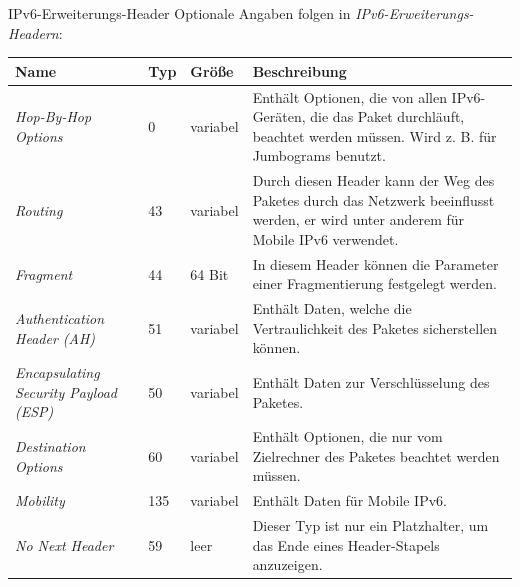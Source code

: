 \begin{bonus}{IPv6-Erweiterungs-Header}
    Optionale Angaben folgen in \emph{IPv6-Erweiterungs-Headern}:

    \begin{tabularx}{\textwidth}{|X|l|l|X|}
        \hline
        Name                                        & Typ & Größe    & Beschreibung                                                                                                                         \\
        \hline
        \hline
        \emph{Hop-By-Hop Options}                   & 0   & variabel & Enthält Optionen, die von allen IPv6-Geräten, die das Paket durchläuft, beachtet werden müssen. Wird z. B. für Jumbograms benutzt.   \\
        \hline
        \emph{Routing}                              & 43  & variabel & Durch diesen Header kann der Weg des Paketes durch das Netzwerk beeinflusst werden, er wird unter anderem für Mobile IPv6 verwendet. \\
        \hline
        \emph{Fragment}                             & 44  & 64 Bit   & In diesem Header können die Parameter einer Fragmentierung festgelegt werden.                                                        \\
        \hline
        \emph{Authentication Header (AH)}           & 51  & variabel & Enthält Daten, welche die Vertraulichkeit des Paketes sicherstellen können.                                                          \\
        \hline
        \emph{Encapsulating Security Payload (ESP)} & 50  & variabel & Enthält Daten zur Verschlüsselung des Paketes.                                                                                       \\
        \hline
        \emph{Destination Options}                  & 60  & variabel & Enthält Optionen, die nur vom Zielrechner des Paketes beachtet werden müssen.                                                        \\
        \hline
        \emph{Mobility}                             & 135 & variabel & Enthält Daten für Mobile IPv6.                                                                                                       \\
        \hline
        \emph{No Next Header}                       & 59  & leer     & Dieser Typ ist nur ein Platzhalter, um das Ende eines Header-Stapels anzuzeigen.                                                     \\
        \hline
    \end{tabularx}
\end{bonus}
